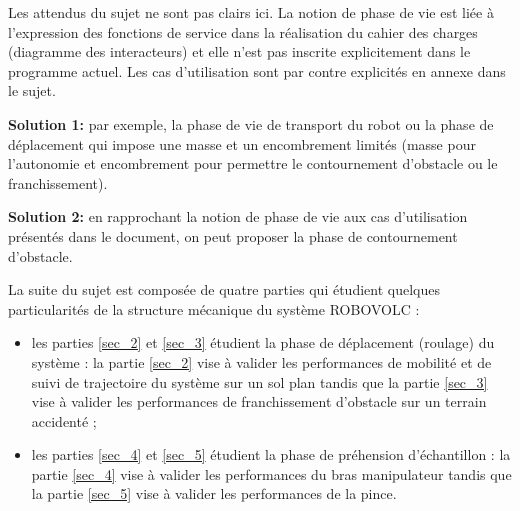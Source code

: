 \ifprof
\begin{corrige}
Les attendus du sujet ne sont pas clairs ici. La notion de phase de vie est liée à l’expression des fonctions de service dans la réalisation du cahier des charges (diagramme des interacteurs) et elle n’est pas inscrite explicitement dans le programme actuel. Les cas d’utilisation sont par contre explicités en annexe dans le sujet.

\textbf{Solution 1:} par exemple, la phase de vie de transport du robot ou la phase de déplacement qui impose une masse et un encombrement limités (masse pour l’autonomie et encombrement pour permettre le contournement d’obstacle ou le franchissement).

\textbf{Solution 2:}  en rapprochant la notion de phase de vie aux cas d’utilisation présentés dans le document, on peut proposer la phase de contournement d’obstacle.

\end{corrige}
\else
\fi

La suite du sujet est composée de quatre parties qui étudient quelques particularités de la
structure mécanique du système ROBOVOLC :
\begin{itemize}
\item les parties \ref{sec_2} et \ref{sec_3} étudient la phase de déplacement (roulage) du système : la partie \ref{sec_2} vise
à valider les performances de mobilité et de suivi de trajectoire du système sur un sol plan
tandis que la partie \ref{sec_3} vise à valider les performances de franchissement d'obstacle sur un
terrain accidenté ;
\item les parties \ref{sec_4} et \ref{sec_5} étudient la phase de préhension d'échantillon : la partie \ref{sec_4} vise à valider
les performances du bras manipulateur tandis que la partie \ref{sec_5} vise à valider les
performances de la pince.
\end{itemize}


